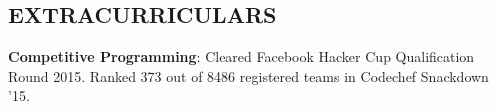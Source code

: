 \documentclass{res}
\begin{document}
\begin{resume}
\section{EXTRACURRICULARS}          
     {\bf Competitive Programming}: Cleared Facebook Hacker Cup Qualification Round 2015. Ranked 373 out of 8486 registered teams in Codechef Snackdown '15.
 
\end{resume}
\end{document}
